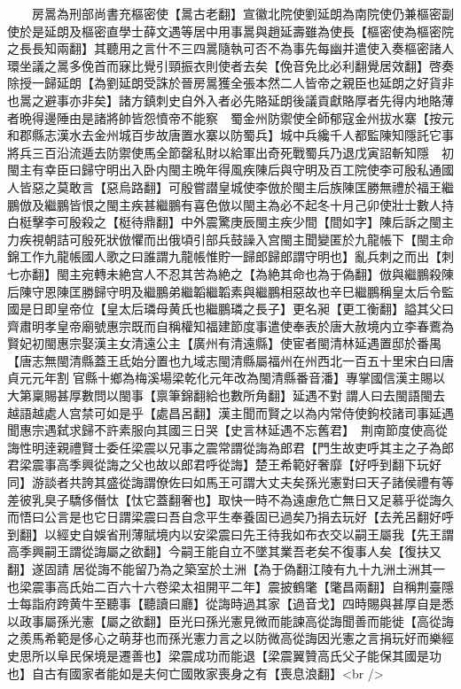　　房暠為刑部尚書充樞密使【暠古老翻】宣徽北院使劉延朗為南院使仍兼樞密副使於是延朗及樞密直學士薛文遇等居中用事暠與趙延壽雖為使長【樞密使為樞密院之長長知兩翻】其聽用之言什不三四暠隨執可否不為事先每幽并遣使入奏樞密諸人環坐議之暠多俛首而寐比覺引頸振衣則使者去矣【俛音免比必利翻覺居效翻】啓奏除授一歸延朗【為劉延朗受誅於晉房暠獲全張本然二人皆帝之親臣也延朗之好貨非也暠之避事亦非矣】諸方鎮刺史自外入者必先賂延朗後議貢獻賂厚者先得内地賂薄者晩得邊陲由是諸將帥皆怨憤帝不能察　蜀金州防禦使全師郁寇金州拔水寨【按元和郡縣志漢水去金州城百步故唐置水寨以防蜀兵】城中兵纔千人都監陳知隱託它事將兵三百沿流遁去防禦使馬全節罄私財以給軍出奇死戰蜀兵乃退戊寅詔斬知隱　初閩主有幸臣曰歸守明出入卧内閩主晩年得風疾陳后與守明及百工院使李可殷私通國人皆惡之莫敢言【惡烏路翻】可殷嘗譛皇城使李倣於閩主后族陳匡勝無禮於福王繼鵬倣及繼鵬皆恨之閩主疾甚繼鵬有喜色倣以閩主為必不起冬十月己卯使壯士數人持白梃擊李可殷殺之【梃待鼎翻】中外震驚庚辰閩主疾少間【間如字】陳后訴之閩主力疾視朝詰可殷死狀倣懼而出俄頃引部兵鼓譟入宫閩主聞變匿於九龍帳下【閩主命錦工作九龍帳國人歌之曰誰謂九龍帳惟貯一歸郎歸郎謂守明也】亂兵刺之而出【刺七亦翻】閩主宛轉未絶宫人不忍其苦為絶之【為絶其命也為于偽翻】倣與繼鵬殺陳后陳守恩陳匡勝歸守明及繼鵬弟繼韜繼韜素與繼鵬相惡故也辛巳繼鵬稱皇太后令監國是日即皇帝位【皇太后璘母黄氏也繼鵬璘之長子】更名昶【更工衡翻】謚其父曰齊肅明孝皇帝廟號惠宗既而自稱權知福建節度事遣使奉表於唐大赦境内立李春鷰為賢妃初閩惠宗娶漢主女清遠公主【廣州有清遠縣】使宦者閩清林延遇置邸於番禺【唐志無閩清縣蓋王氐始分置也九域志閩清縣屬福州在州西北一百五十里宋白曰唐貞元元年割官縣十鄉為梅溪場梁乾化元年改為閩清縣番音潘】專掌國信漢主賜以大第稟賜甚厚數問以閩事【禀筆錦翻給也數所角翻】延遇不對謂人曰去閩語閩去越語越處人宫禁可如是乎【處昌呂翻】漢主聞而賢之以為内常侍使鉤校諸司事延遇聞惠宗遇弑求歸不許素服向其國三日哭【史言林延遇不忘舊君】　荆南節度使高從誨性明逹親禮賢士委任梁震以兄事之震常謂從誨為郎君【門生故吏呼其主之子為郎君梁震事高季興從誨之父也故以郎君呼從誨】楚王希範好奢靡【好呼到翻下玩好同】游談者共誇其盛從誨謂僚佐曰如馬王可謂大丈夫矣孫光憲對曰天子諸侯禮有等差彼乳臭子驕侈僭忲【忲它蓋翻奢也】取快一時不為遠慮危亡無日又足慕乎從誨久而悟曰公言是也它日謂梁震曰吾自念平生奉養固已過矣乃捐去玩好【去羌呂翻好呼到翻】以經史自娛省刑薄賦境内以安梁震曰先王待我如布衣交以嗣王屬我【先王謂高季興嗣王謂從誨屬之欲翻】今嗣王能自立不墜其業吾老矣不復事人矣【復扶又翻】遂固請居從誨不能留乃為之築室於土洲【為于偽翻江陵有九十九洲土洲其一也梁震事高氏始二百六十六卷梁太祖開平二年】震披鶴氅【氅昌兩翻】自稱荆臺隱士每詣府跨黄牛至聽事【聽讀曰廳】從誨時過其家【過音戈】四時賜與甚厚自是悉以政事屬孫光憲【屬之欲翻】臣光曰孫光憲見微而能諫高從誨聞善而能徙【高從誨之羨馬希範是侈心之萌芽也而孫光憲力言之以防微高從誨因光憲之言捐玩好而樂經史思所以阜民保境是遷善也】梁震成功而能退【梁震翼贊高氏父子能保其國是功也】自古有國家者能如是夫何亡國敗家喪身之有【喪息浪翻】<br />
